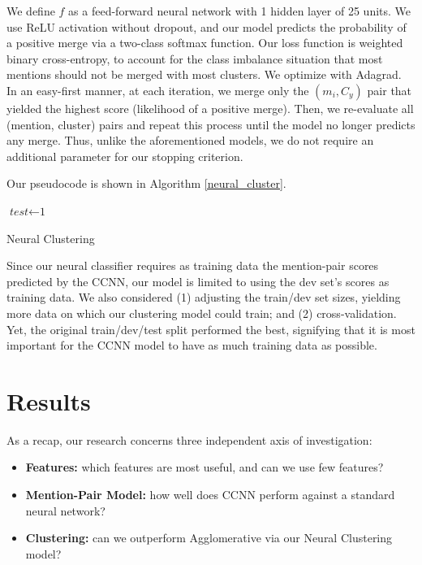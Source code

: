 \documentclass[11pt,a4paper]{article}
\begin{document}
We define $f$ as a feed-forward neural network with 1 hidden layer of 25 units.  We use ReLU activation without dropout, and our model predicts the probability of a positive merge via a two-class softmax function.  Our loss function is weighted binary cross-entropy, to account for the class imbalance situation that most mentions should not be merged with most clusters.  We optimize with Adagrad.  In an easy-first manner, at each iteration, we merge only the $(m_i,C_y)$ pair that yielded the highest score (likelihood of a positive merge).  Then, we re-evaluate all (mention, cluster) pairs and repeat this process until the model no longer predicts any merge.  Thus, unlike the aforementioned models, we do not require an additional parameter for our stopping criterion.

Our pseudocode is shown in Algorithm \ref{neural_cluster}.

\begin{algorithm}
    \begin{algorithmic}[1]
\State $\textit{test} \gets \text{1}$
    \end{algorithmic}
\caption{Neural Clustering}
\label{neural_cluster}
\end{algorithm}

Since our neural classifier requires as training data the mention-pair scores predicted by the CCNN, our model is limited to using the dev set's scores as training data.  We also considered (1) adjusting the train/dev set sizes, yielding more data on which our clustering model could train; and (2) cross-validation.  Yet, the original train/dev/test split performed the best, signifying that it is most important for the CCNN model to have as much training data as possible.

\section{Results}
As a recap, our research concerns three independent axis of investigation:
\begin{itemize}
\item \textbf{Features:} which features are most useful, and can we use few features?
\item \textbf{Mention-Pair Model:} how well does CCNN perform against a standard neural network?
\item \textbf{Clustering:} can we outperform Agglomerative via our Neural Clustering model?
\end{itemize}
\end{document}

